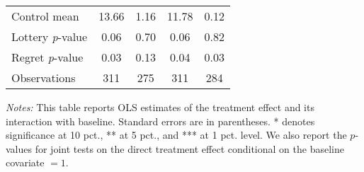 \begin{table}[htbp]
{\begin{threeparttable}
\begin{tabular}{l*{4}{c}}
Control mean    &    13.66         &     1.16         &    11.78         &     0.12         \\
Lottery \emph{p}-value&     0.06         &     0.70         &     0.06         &     0.82         \\
Regret \emph{p}-value&     0.03         &     0.13         &     0.04         &     0.03         \\
Observations    &      311         &      275         &      311         &      284         \\
\bottomrule \end{tabular} \begin{tablenotes}[flushleft] \footnotesize \item \emph{Notes:} This table reports OLS estimates of the treatment effect and its interaction with baseline. Standard errors are in parentheses. * denotes significance at 10 pct., ** at 5 pct., and *** at 1 pct. level. We also report the \(p\)-values for joint tests on the direct treatment effect conditional on the baseline covariate $= 1$. \end{tablenotes} \end{threeparttable} } \end{table}

